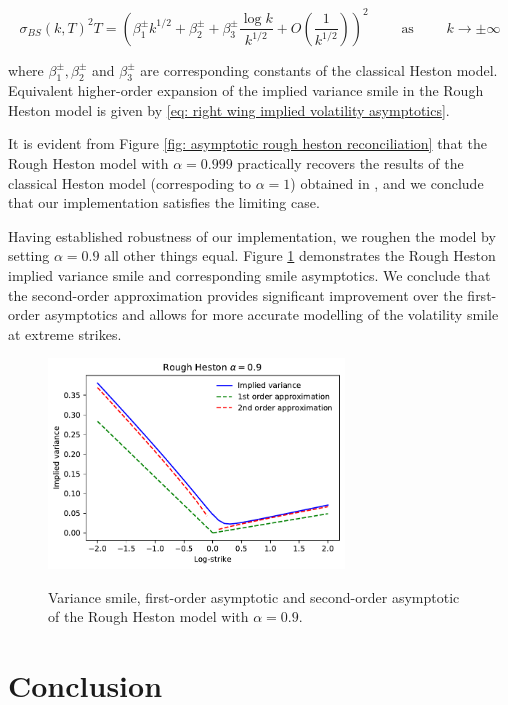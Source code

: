 \documentclass[12pt,twoside]{article}
\theoremstyle{plain}
\theoremstyle{plain}
\theoremstyle{definition}
\theoremstyle{remark}
\numberwithin{equation}{section}
\begin{document}
$$
\sigma_{B S}(k, T)^{2} T=\left(\beta^\pm_{1} k^{1 / 2}+\beta^\pm_{2}+\beta^\pm_{3} \frac{\log k}{k^{1 / 2}}+O\left(\frac{1}{k^{1 / 2}}\right)\right)^{2}
\qquad \text{ as } \qquad k \rightarrow \pm \infty
$$

where $\beta^\pm_1, \beta^\pm_2$ and $\beta^\pm_3$ are corresponding constants of the classical Heston model. Equivalent higher-order expansion of the implied variance smile in the Rough Heston model is given by \eqref{eq: right wing implied volatility asymptotics}.

It is evident from Figure \ref{fig: asymptotic rough heston reconciliation} that the Rough Heston model with $\alpha=0.999$ practically recovers the results of the classical Heston model (correspoding to $\alpha = 1$) obtained in \cite{FGGS10}, and we conclude that our implementation satisfies the limiting case.

Having established robustness of our implementation, we roughen the model by setting $\alpha = 0.9$ all other things equal. Figure \ref{fig: asymptotic rough heston 0.9} demonstrates the Rough Heston implied variance smile and corresponding smile asymptotics. We conclude that the second-order approximation provides significant improvement over the first-order asymptotics and allows for more accurate modelling of the volatility smile at extreme strikes.

\newpage\clearpage

\begin{figure}[H]
\centering
\includegraphics[width=0.7\textwidth]{figures/asymptotics.pdf} \\
\caption{Variance smile, first-order asymptotic and second-order asymptotic of the Rough Heston model with $\alpha=0.9.$}
\label{fig: asymptotic rough heston 0.9}
\end{figure}

\section{Conclusion}
\label{sec: conclusion}
\end{document}
